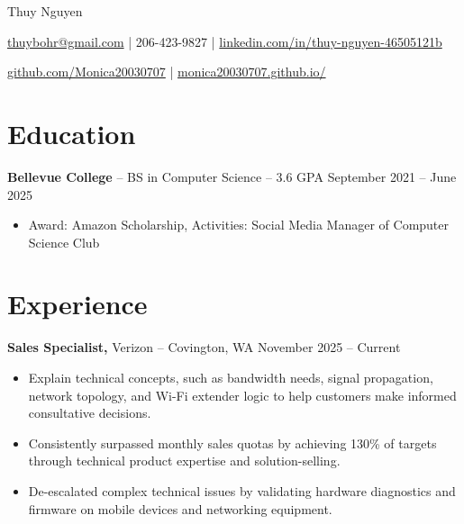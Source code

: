 \documentclass[11pt]{article}       %
\begin{document}
\centerline{\Huge Thuy Nguyen}

\vspace{5pt}

\centerline{\href{mailto:thuybohr@gmail.com}{thuybohr@gmail.com} | 206-423-9827 |
\href{https://www.linkedin.com/in/thuy-nguyen-46505121b/}{linkedin.com/in/thuy-nguyen-46505121b}}

\centerline{\href{https://github.com/Monica20030707}{github.com/Monica20030707} | 
\href{https://monica20030707.github.io/}{monica20030707.github.io/}} 

\vspace{-9pt}

\section*{Education}
\textbf{Bellevue College} -- BS in Computer Science -- 3.6 GPA \hfill September 2021 -- June 2025\\
\vspace{-9pt}
\begin{itemize}
  \item Award: Amazon Scholarship, Activities: Social Media Manager of Computer Science Club
\end{itemize}

\vspace{-18.5pt}

\section*{Experience}

\textbf{Sales Specialist,} {Verizon} -- Covington, WA \hfill November 2025 -- Current \\
\vspace{-9pt}
\begin{itemize}
  \item Explain technical concepts, such as bandwidth needs, signal propagation, network topology, and Wi-Fi extender logic to help customers make informed consultative decisions.
  \item Consistently surpassed monthly sales quotas by achieving 130\% of targets through technical product expertise and solution-selling.
  \item De-escalated complex technical issues by validating hardware diagnostics and firmware on mobile devices and networking equipment.
\end{itemize}
\end{document}

